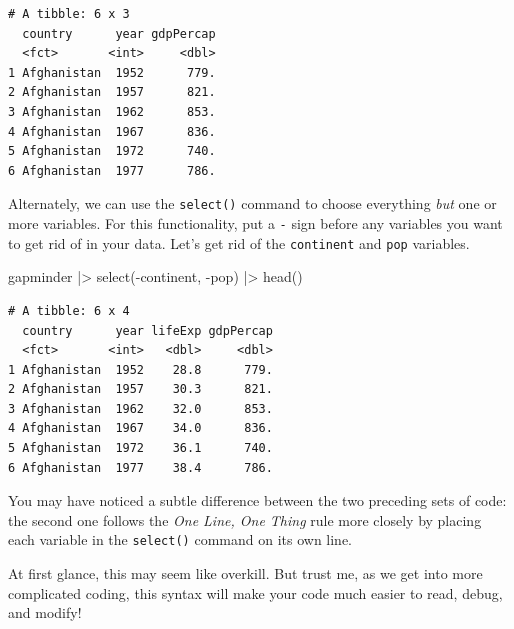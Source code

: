 \documentclass[
  letterpaper,
]{book}
\newenvironment{Shaded}{\begin{snugshade}}{\end{snugshade}}
\newcommand{\FunctionTok}[1]{\textcolor[rgb]{0.28,0.35,0.67}{#1}}
\newcommand{\NormalTok}[1]{\textcolor[rgb]{0.00,0.23,0.31}{#1}}
\newcommand{\SpecialCharTok}[1]{\textcolor[rgb]{0.37,0.37,0.37}{#1}}
\begin{document}
\begin{verbatim}
# A tibble: 6 x 3
  country      year gdpPercap
  <fct>       <int>     <dbl>
1 Afghanistan  1952      779.
2 Afghanistan  1957      821.
3 Afghanistan  1962      853.
4 Afghanistan  1967      836.
5 Afghanistan  1972      740.
6 Afghanistan  1977      786.
\end{verbatim}

Alternately, we can use the \texttt{select()} command to choose
everything \emph{but} one or more variables. For this functionality, put
a \texttt{-} sign before any variables you want to get rid of in your
data. Let's get rid of the \texttt{continent} and \texttt{pop}
variables.

\begin{Shaded}
\begin{Highlighting}[]
\NormalTok{gapminder }\SpecialCharTok{|\textgreater{}} 
  \FunctionTok{select}\NormalTok{(}\SpecialCharTok{{-}}\NormalTok{continent,}
         \SpecialCharTok{{-}}\NormalTok{pop) }\SpecialCharTok{|\textgreater{}} 
  \FunctionTok{head}\NormalTok{()}
\end{Highlighting}
\end{Shaded}

\begin{verbatim}
# A tibble: 6 x 4
  country      year lifeExp gdpPercap
  <fct>       <int>   <dbl>     <dbl>
1 Afghanistan  1952    28.8      779.
2 Afghanistan  1957    30.3      821.
3 Afghanistan  1962    32.0      853.
4 Afghanistan  1967    34.0      836.
5 Afghanistan  1972    36.1      740.
6 Afghanistan  1977    38.4      786.
\end{verbatim}

\begin{tcolorbox}[enhanced jigsaw, colframe=quarto-callout-tip-color-frame, breakable, arc=.35mm, bottomtitle=1mm, bottomrule=.15mm, colbacktitle=quarto-callout-tip-color!10!white, rightrule=.15mm, colback=white, opacityback=0, opacitybacktitle=0.6, coltitle=black, left=2mm, toptitle=1mm, toprule=.15mm, titlerule=0mm, leftrule=.75mm, title=\textcolor{quarto-callout-tip-color}{\faLightbulb}\hspace{0.5em}{Tip from the Helpdesk: One Line, One Thing, Strikes Again}]

You may have noticed a subtle difference between the two preceding sets
of code: the second one follows the \emph{One Line, One Thing} rule more
closely by placing each variable in the \texttt{select()} command on its
own line.

At first glance, this may seem like overkill. But trust me, as we get
into more complicated coding, this syntax will make your code much
easier to read, debug, and modify!

\end{tcolorbox}
\end{document}
